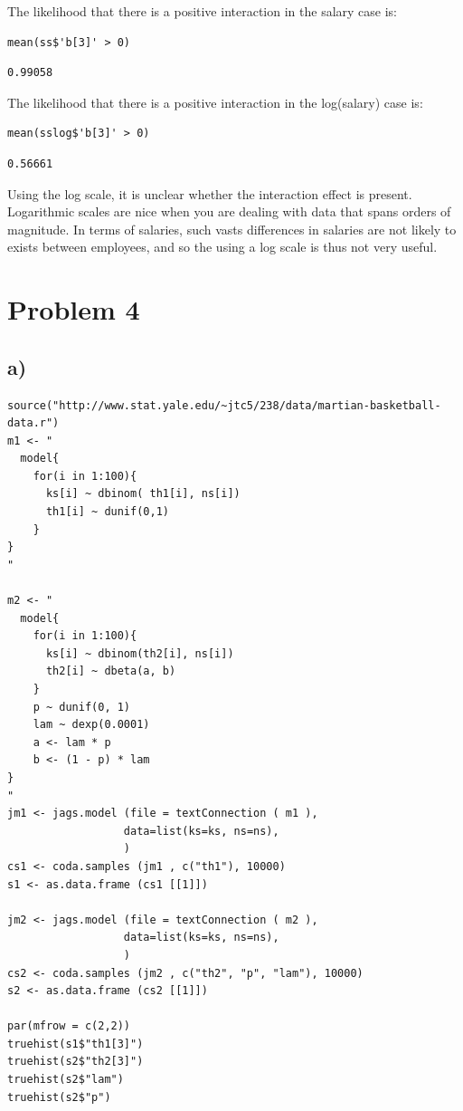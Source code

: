\documentclass[11pt]{article}
\begin{document}
The likelihood that there is a positive interaction in the salary case is:
\begin{verbatim}
mean(ss$'b[3]' > 0)
\end{verbatim}

\begin{verbatim}
0.99058
\end{verbatim}

The likelihood that there is a positive interaction in the log(salary) case is:
\begin{verbatim}
mean(sslog$'b[3]' > 0)
\end{verbatim}

\begin{verbatim}
0.56661
\end{verbatim}

Using the log scale, it is unclear whether the interaction effect is present. Logarithmic scales are nice when you are dealing with data that spans orders of magnitude. In terms of salaries, such vasts differences in salaries are not likely to exists between employees, and so the using a log scale is thus not very useful.

\section*{Problem 4}
\label{sec:orge7c39ab}

\subsection*{a)}
\label{sec:orgddff993}
\begin{verbatim}
source("http://www.stat.yale.edu/~jtc5/238/data/martian-basketball-data.r")
m1 <- "
  model{
    for(i in 1:100){
      ks[i] ~ dbinom( th1[i], ns[i])
      th1[i] ~ dunif(0,1)
    }
}
"

m2 <- "
  model{
    for(i in 1:100){
      ks[i] ~ dbinom(th2[i], ns[i])
      th2[i] ~ dbeta(a, b)
    }
    p ~ dunif(0, 1)
    lam ~ dexp(0.0001)
    a <- lam * p
    b <- (1 - p) * lam
}
"
jm1 <- jags.model (file = textConnection ( m1 ),
                  data=list(ks=ks, ns=ns),
                  )
cs1 <- coda.samples (jm1 , c("th1"), 10000)
s1 <- as.data.frame (cs1 [[1]])

jm2 <- jags.model (file = textConnection ( m2 ),
                  data=list(ks=ks, ns=ns),
                  )
cs2 <- coda.samples (jm2 , c("th2", "p", "lam"), 10000)
s2 <- as.data.frame (cs2 [[1]])

par(mfrow = c(2,2))
truehist(s1$"th1[3]")
truehist(s2$"th2[3]")
truehist(s2$"lam")
truehist(s2$"p")
\end{verbatim}
\end{document}
